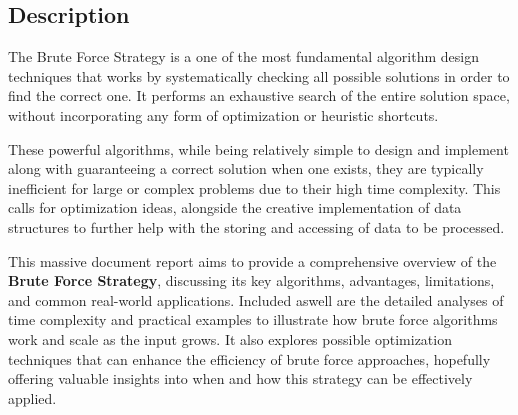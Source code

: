 \subsection{Description}
The Brute Force Strategy is a one of the most fundamental algorithm design techniques that works by systematically checking all possible solutions in order to find the correct one. It performs an exhaustive search of the entire solution space, without incorporating any form of optimization or heuristic shortcuts. 

These powerful algorithms, while being relatively simple to design and implement along with guaranteeing a correct solution when one exists, they are typically inefficient for large or complex problems due to their high time complexity. This calls for optimization ideas, alongside the creative implementation of data structures to further help with the storing and accessing of data to be processed.

This massive document report aims to provide a comprehensive overview of the \textbf{Brute Force Strategy}, discussing its key algorithms, advantages, limitations, and common real-world applications. Included aswell are the detailed analyses of time complexity and practical examples to illustrate how brute force algorithms work and scale as the input grows. It also explores possible optimization techniques that can enhance the efficiency of brute force approaches, hopefully offering valuable insights into when and how this strategy can be effectively applied.